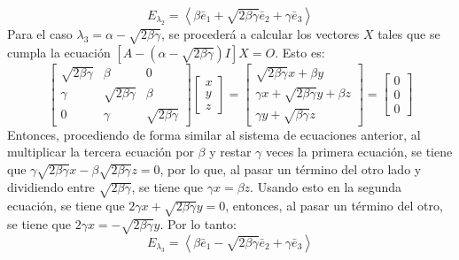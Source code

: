 \begin{solucion}
\begin{enumerate}[$a$)]
  \begin{equation*}
   E_{\lambda_2} = \left< \beta\bar{e}_1 + \sqrt{2\beta\gamma}\bar{e}_2 + \gamma\bar{e}_3 \right>
  \end{equation*}
  Para el caso $\lambda_3 = \alpha - \sqrt{2\beta\gamma}$, se proceder\'a a calcular los vectores $X$ tales que se cumpla la ecuaci\'on $\left[ A - \left(\alpha - \sqrt{2\beta\gamma}\right) I \right]X = O$. Esto es:
  \begin{equation*}
   \begin{bmatrix}
    \sqrt{2\beta\gamma} & \beta & 0 \\
    \gamma & \sqrt{2\beta\gamma} & \beta \\
    0 & \gamma & \sqrt{2\beta\gamma}
   \end{bmatrix}
   \begin{bmatrix}
    x \\ y \\ z 
   \end{bmatrix}
   = 
   \begin{bmatrix}
    \sqrt{2\beta\gamma}x + \beta y \\
    \gamma x + \sqrt{2\beta\gamma}y + \beta z \\
    \gamma y + \sqrt{\beta\gamma}z
   \end{bmatrix}
   =
   \begin{bmatrix}
    0 \\ 0 \\ 0
   \end{bmatrix}
  \end{equation*}
  Entonces, procediendo de forma similar al sistema de ecuaciones anterior, al multiplicar la tercera ecuaci\'on por $\beta$ y restar $\gamma$ veces la primera ecuaci\'on, se tiene que $\gamma\sqrt{2\beta\gamma}x - \beta\sqrt{2\beta\gamma}z = 0$, por lo que, al pasar un t\'ermino del otro lado y dividiendo entre $\sqrt{2\beta\gamma}$, se tiene que $\gamma x = \beta z$. Usando esto en la segunda ecuaci\'on, se tiene que $2\gamma x + \sqrt{2\beta\gamma} y = 0$, entonces, al pasar un t\'ermino del otro, se tiene que $2\gamma x = - \sqrt{2\beta\gamma} y$. Por lo tanto:
  \begin{equation*}
   E_{\lambda_3} = \left< \beta\bar{e}_1 - \sqrt{2\beta\gamma}\bar{e}_2 + \gamma\bar{e}_3 \right>
  \end{equation*}
  

\end{enumerate}
\end{solucion}
